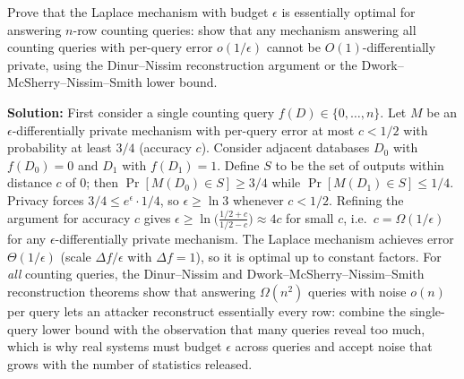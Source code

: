 \begin{exercise}[Challenge]
Prove that the Laplace mechanism with budget $\epsilon$ is essentially optimal for answering $n$-row counting queries: show that any mechanism answering all counting queries with per-query error $o(1/\epsilon)$ cannot be $O(1)$-differentially private, using the Dinur--Nissim reconstruction argument or the Dwork--McSherry--Nissim--Smith lower bound.
\end{exercise}
\textbf{Solution:} First consider a single counting query $f(D) \in \{0, \ldots, n\}$. Let $M$ be an $\epsilon$-differentially private mechanism with per-query error at most $c < 1/2$ with probability at least $3/4$ (accuracy $c$). Consider adjacent databases $D_0$ with $f(D_0) = 0$ and $D_1$ with $f(D_1) = 1$. Define $S$ to be the set of outputs within distance $c$ of $0$; then $\Pr[M(D_0) \in S] \ge 3/4$ while $\Pr[M(D_1) \in S] \le 1/4$. Privacy forces $3/4 \le e^{\epsilon} \cdot 1/4$, so $\epsilon \ge \ln 3$ whenever $c < 1/2$. Refining the argument for accuracy $c$ gives $\epsilon \ge \ln\bigl(\frac{1/2+c}{1/2-c}\bigr) \approx 4c$ for small $c$, i.e.\ $c = \Omega(1/\epsilon)$ for any $\epsilon$-differentially private mechanism. The Laplace mechanism achieves error $\Theta(1/\epsilon)$ (scale $\Delta f/\epsilon$ with $\Delta f = 1$), so it is optimal up to constant factors. For \emph{all} counting queries, the Dinur--Nissim and Dwork--McSherry--Nissim--Smith reconstruction theorems show that answering $\Omega(n^2)$ queries with noise $o(n)$ per query lets an attacker reconstruct essentially every row: combine the single-query lower bound with the observation that many queries reveal too much, which is why real systems must budget $\epsilon$ across queries and accept noise that grows with the number of statistics released.

